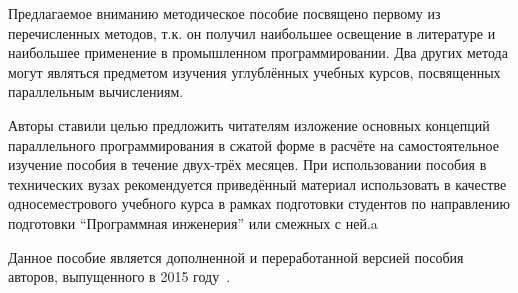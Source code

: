 Предлагаемое вниманию методическое пособие посвящено первому из перечисленных методов, т.к. он получил наибольшее освещение в литературе и наибольшее применение в промышленном программировании.
Два других метода могут являться предметом изучения углублённых учебных курсов, посвященных параллельным вычислениям.

Авторы ставили целью предложить читателям изложение основных концепций параллельного программирования в сжатой форме в расчёте на самостоятельное изучение пособия в течение двух-трёх месяцев.
При использовании пособия в технических вузах рекомендуется приведённый материал использовать в качестве односеместрового учебного курса в рамках подготовки студентов по направлению подготовки \enquote{Программная инженерия} или смежных с ней.a

Данное пособие является дополненной и переработанной версией пособия авторов, выпущенного в 2015 году~\cite{SosninBalakshin2015}.
